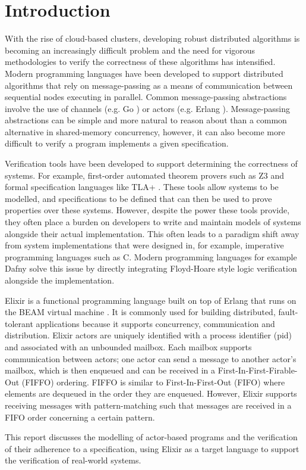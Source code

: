 \chapter{Introduction}
With the rise of cloud-based clusters, developing robust distributed algorithms is becoming an increasingly difficult problem and the need for vigorous methodologies to verify the correctness of these algorithms has intensified. Modern programming languages have been developed to support distributed algorithms that rely on message-passing as a means of communication between sequential nodes executing in parallel. Common message-passing abstractions involve the use of channels (e.g. Go \cite{go}) or actors \cite{actor} (e.g. Erlang \cite{erlang}). Message-passing abstractions can be simple and more natural to reason about than a common alternative in shared-memory concurrency, however, it can also become more difficult to verify a program implements a given specification.
\par
Verification tools have been developed to support determining the correctness of systems. For example, first-order automated theorem provers such as Z3 \cite{z3} and formal specification languages like TLA+ \cite{tlaplus}. These tools allow systems to be modelled, and specifications to be defined that can then be used to prove properties over these systems. However, despite the power these tools provide, they often place a burden on developers to write and maintain models of systems alongside their actual implementation. This often leads to a paradigm shift away from system implementations that were designed in, for example, imperative programming languages such as C. Modern programming languages for example Dafny \cite{dafny} solve this issue by directly integrating Floyd-Hoare style logic verification alongside the implementation.
\par
Elixir \cite{elixir} is a functional programming language built on top of Erlang that runs on the BEAM virtual machine \cite{beam}. It is commonly used for building distributed, fault-tolerant applications because it supports concurrency, communication and distribution. Elixir actors are uniquely identified with a process identifier (pid) and associated with an unbounded mailbox. Each mailbox supports communication between actors; one actor can send a message to another actor's mailbox, which is then enqueued and can be received in a First-In-First-Firable-Out (FIFFO) ordering. FIFFO is similar to First-In-First-Out (FIFO) where elements are dequeued in the order they are enqueued. However, Elixir supports receiving messages with pattern-matching such that messages are received in a FIFO order concerning a certain pattern.
\par
This report discusses the modelling of actor-based programs and the verification of their adherence to a specification, using Elixir as a target language to support the verification of real-world systems.
